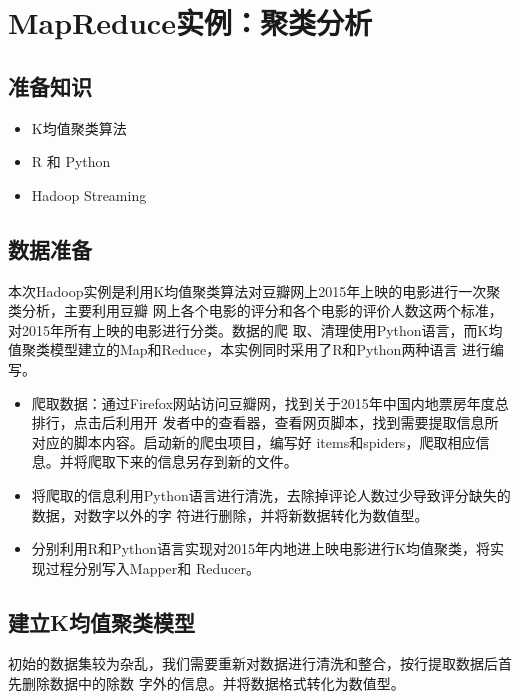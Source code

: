 \section{MapReduce实例：聚类分析}\label{ux5b9eux4f8bux5206ux67902015ux5e74ux4e0aux6620ux7535ux5f71ux7684ux805aux7c7bux5206ux6790}

\subsection{准备知识}\label{ux51c6ux5907ux77e5ux8bc6}

\begin{itemize}
\itemsep1pt\parskip0pt
\item
  K均值聚类算法
\item
  R 和 Python
\item
  Hadoop Streaming
\end{itemize}

\subsection{数据准备}\label{ux6570ux636eux51c6ux5907}

本次Hadoop实例是利用K均值聚类算法对豆瓣网上2015年上映的电影进行一次聚类分析，主要利用豆瓣
网上各个电影的评分和各个电影的评价人数这两个标准，对2015年所有上映的电影进行分类。数据的爬
取、清理使用Python语言，而K均值聚类模型建立的Map和Reduce，本实例同时采用了R和Python两种语言
进行编写。

\begin{itemize}
\item
  爬取数据：通过Firefox网站访问豆瓣网，找到关于2015年中国内地票房年度总排行，点击后利用开
  发者中的查看器，查看网页脚本，找到需要提取信息所对应的脚本内容。启动新的爬虫项目，编写好
  items和spiders，爬取相应信息。并将爬取下来的信息另存到新的文件。
\item
  将爬取的信息利用Python语言进行清洗，去除掉评论人数过少导致评分缺失的数据，对数字以外的字
  符进行删除，并将新数据转化为数值型。
\item
  分别利用R和Python语言实现对2015年内地进上映电影进行K均值聚类，将实现过程分别写入Mapper和
  Reducer。
\end{itemize}

\subsection{建立K均值聚类模型}\label{ux5efaux7acbkux5747ux503cux805aux7c7bux6a21ux578b}

初始的数据集较为杂乱，我们需要重新对数据进行清洗和整合，按行提取数据后首先删除数据中的除数
字外的信息。并将数据格式转化为数值型。

